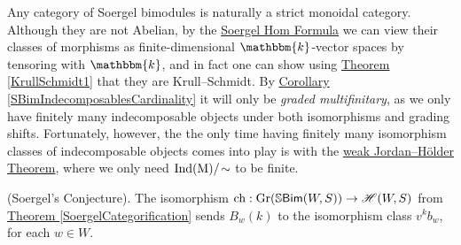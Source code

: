 \noindent%
Any category of Soergel bimodules is naturally a strict monoidal category. Although they are not Abelian, by the \hyperref[SoergelHom]{Soergel Hom Formula} we can view their classes of morphisms as finite-dimensional $\mathbbm{k}$-vector spaces by tensoring with $\mathbbm{k}$, and in fact one can show using \hyperref[KrullSchmidt1]{Theorem \ref*{KrullSchmidt1}} that they are Krull--Schmidt. By \hyperref[SBimIndecomposablesCardinality]{Corollary \ref*{SBimIndecomposablesCardinality}} it will only be {\em graded multifinitary}, as we only have finitely many indecomposable objects under both isomorphisms and grading shifts. Fortunately, however, the the only time having finitely many isomorphism classes of indecomposable objects comes into play is with the \hyperref[JordanHolder]{weak Jordan--H\"{o}lder Theorem}, where we only need $\textup{Ind}(\textup{M})/\!\sim$ to be finite.\\%

\noindent\begin{theorem}\label{SoergelConjecture}\textup{(Soergel's Conjecture).} The isomorphism $\textup{ch} : \textup{Gr}(\mathbb{S}\textup{\textsf{Bim}}(W, S)) \to \mathscr{H}(W, S)$ from \hyperref[SoergelCategorification]{Theorem \ref*{SoergelCategorification}} sends $B_w(k)$ to the isomorphism class $v^k b_w$, for each $w \in W$.\\
\end{theorem}

